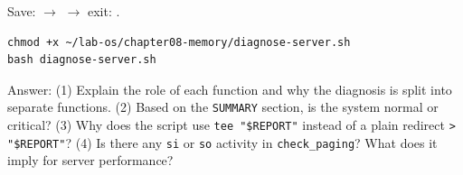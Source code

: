 \begin{notebox}
Save:  $\to$  $\to$ exit: .
\end{notebox}

\begin{lstlisting}[caption={Run the diagnostic script}]
chmod +x ~/lab-os/chapter08-memory/diagnose-server.sh
bash diagnose-server.sh
\end{lstlisting}

Answer: (1) Explain the role of each function and why the diagnosis is split into
separate functions. (2) Based on the \texttt{SUMMARY} section, is the system normal
or critical? (3) Why does the script use \texttt{tee "\$REPORT"} instead of a plain
redirect \texttt{> "\$REPORT"}? (4) Is there any \texttt{si} or \texttt{so} activity
in \texttt{check\_paging}? What does it imply for server performance?
